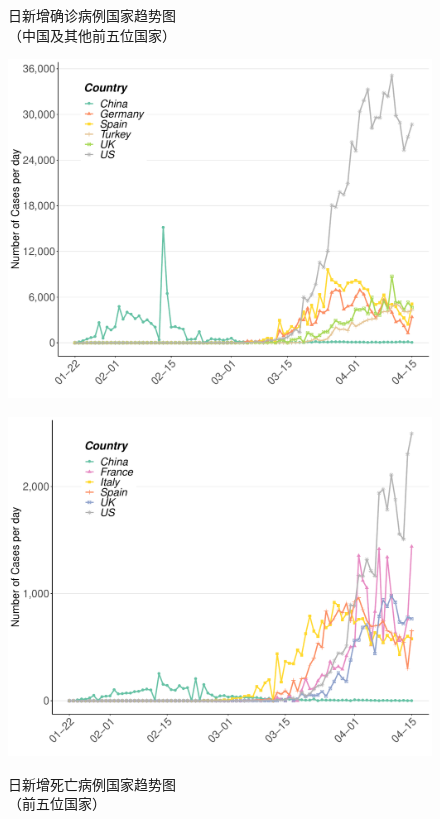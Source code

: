 \documentclass[
]{article}
\begin{document}
\begin{figure}[H]
\centering
\begin{minipage}[b]{0.48\linewidth}
\caption{日新增确诊病例国家趋势图\\（中国及其他前五位国家）}
\includegraphics[]{./input/covid2.pdf}
\label{}
\end{minipage}
\quad
\begin{minipage}[b]{0.48\linewidth}
\caption{日新增死亡病例国家趋势图\\（前五位国家） }
\includegraphics[]{./input/covid3.pdf}
\label{}
\end{minipage}
\end{figure}
\end{document}
